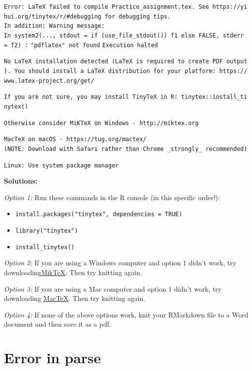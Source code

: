 \documentclass[
]{book}
\providecommand{\tightlist}{%
  \setlength{\itemsep}{0pt}\setlength{\parskip}{0pt}}
\begin{document}
\texttt{Error:\ LaTeX\ failed\ to\ compile\ Practice\_assignment.tex.\ See\ https://yihui.org/tinytex/r/\#debugging\ for\ debugging\ tips.}
\texttt{In\ addition:\ Warning\ message:}
\texttt{In\ system2(...,\ stdout\ =\ if\ (use\_file\_stdout())\ f1\ else\ FALSE,\ stderr\ =\ f2)\ :}
\texttt{\textquotesingle{}"pdflatex"\textquotesingle{}\ not\ found}
\texttt{Execution\ halted}

\texttt{No\ LaTeX\ installation\ detected\ (LaTeX\ is\ required\ to\ create\ PDF\ output).\ You\ should\ install\ a\ LaTeX\ distribution\ for\ your\ platform:\ https://www.latex-project.org/get/}

\texttt{If\ you\ are\ not\ sure,\ you\ may\ install\ TinyTeX\ in\ R:\ tinytex::install\_tinytex()}

\texttt{Otherwise\ consider\ MiKTeX\ on\ Windows\ -\ http://miktex.org}

\texttt{MacTeX\ on\ macOS\ -\ https://tug.org/mactex/}
\texttt{(NOTE:\ Download\ with\ Safari\ rather\ than\ Chrome\ \_strongly\_\ recommended)}

\texttt{Linux:\ Use\ system\ package\ manager}

\textbf{Solutions:}

\emph{Option 1:} Run these commands in the R console (in this specific order!):

\begin{itemize}
\tightlist
\item
  \texttt{install.packages("tinytex",\ dependencies\ =\ TRUE)}
\item
  \texttt{library("tinytex")}
\item
  \texttt{install\_tinytex()}
\end{itemize}

\emph{Option 2:} If you are using a Windows computer and option 1 didn't work, try downloading\href{http://miktex.org}{MikTeX}. Then try knitting again.

\emph{Option 3:} If you are using a Mac computer and option 1 didn't work, try downloading \href{https://tug.org/mactex/}{MacTeX}. Then try knitting again.

\emph{Option 4:} If none of the above options work, knit your RMarkdown file to a Word document and then save it as a pdf.

\section*{Error in parse}\label{error-in-parse}
\end{document}
